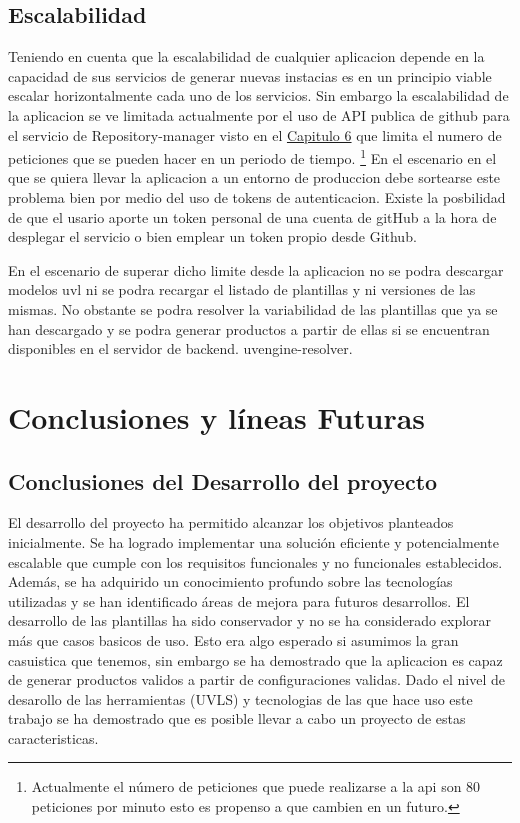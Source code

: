 \documentclass[12pt, a4paper, twoside]{article}
\begin{document}
\subsection{Escalabilidad}
Teniendo en cuenta que la escalabilidad de cualquier aplicacion depende en la capacidad de sus servicios de generar nuevas instacias es en un principio viable 
escalar horizontalmente cada uno de los servicios. Sin embargo la escalabilidad de la aplicacion se ve limitada actualmente por el uso de API publica de github \cite{github_rest_api} 
para el servicio de Repository-manager visto en el \hyperref[sec:Desarrollo de los servicios de backend]{Capitulo 6} que limita el numero de peticiones que se pueden hacer en un periodo de tiempo.
\footnote{Actualmente el número de peticiones que puede realizarse a la api son 80 peticiones por minuto esto es propenso a que cambien en un futuro.}
En el escenario en el que se quiera llevar la aplicacion a un entorno de produccion debe sortearse este problema bien por medio del uso de tokens de autenticacion.
Existe la posbilidad de que el usario aporte un token personal de una cuenta de gitHub a la hora de desplegar el servicio o bien emplear un token propio desde Github.

En el escenario de superar dicho limite desde la aplicacion no se podra descargar modelos uvl ni se podra recargar el listado de plantillas y ni versiones de las mismas.
No obstante se podra resolver la variabilidad de las plantillas que ya se han descargado y se podra generar productos a partir de ellas si se encuentran disponibles en el servidor de backend.
uvengine-resolver. 









\section{Conclusiones y líneas Futuras }
\label{sec:Conclusiones}


\subsection{Conclusiones del Desarrollo del proyecto}
El desarrollo del proyecto ha permitido alcanzar los objetivos planteados inicialmente. Se ha logrado implementar una solución eficiente y potencialmente escalable que cumple con los requisitos funcionales y no funcionales establecidos. Además, se ha adquirido un conocimiento profundo sobre las tecnologías utilizadas y se han identificado áreas de mejora para futuros desarrollos.
El desarrollo de las plantillas ha sido conservador y no se ha considerado explorar más que casos basicos de uso. Esto era algo esperado si asumimos la gran casuistica que tenemos, sin embargo se ha demostrado que la aplicacion es capaz de generar productos validos a partir de configuraciones validas. Dado el nivel de desarollo de las herramientas (UVLS) y tecnologias de las que hace uso este trabajo se ha demostrado que es posible llevar a cabo un proyecto de estas caracteristicas.
\end{document}
